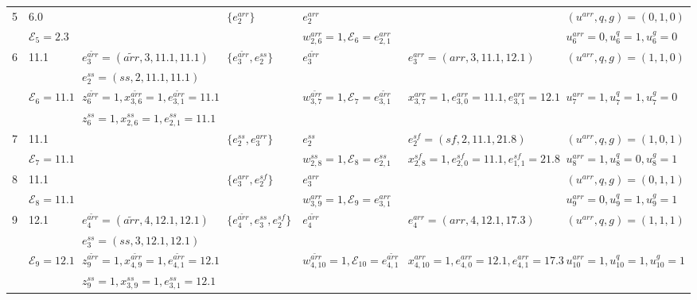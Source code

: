 \documentclass[]{interact}
\theoremstyle{plain}%
\theoremstyle{definition}
\theoremstyle{remark}
\begin{document}
\begin{landscape}
\begin{table}
\begin{tabular}{lllllll}
	     
	     5 & 6.0&&$\{e^{arr}_2\}$&$e^{arr}_{2}$&&$(u^{arr},q,g)=(0,1,0)$\\
	     &$\mathcal{E}_5=2.3$&&&$w^{{arr}}_{2,6}=1,\mathcal{E}_6=e^{{arr}}_{2,1}$&&$u^{arr}_6=0,u^{q}_6=1,u^{g}_6=0$\\\hline
	     
	     
	     6 &11.1 &$e^{\tilde{arr}}_3=({\tilde{arr}},3,11.1,11.1)$&$\{e^{\tilde{arr}}_3,e^{ss}_2\}$ &$e^{\tilde{arr}}_3$ &$e^{{arr}}_3=({{arr}},3,11.1,12.1)$ &$(u^{arr},q,g)=(1,1,0)$\\
	     &&$e^{ss}_2=(ss,2,11.1,11.1)$&&&&\\
	     &$\mathcal{E}_6=11.1$&$z^{\tilde{arr}}_6=1, x^{\tilde{arr}}_{3,6}=1,e^{\tilde{arr}}_{3,1}=11.1$&&$w^{\tilde{arr}}_{3,7}=1,\mathcal{E}_7=e^{\tilde{arr}}_{3,1}$&$x^{{arr}}_{3,7}=1, e^{{arr}}_{3,0}=11.1, e^{{arr}}_{3,1}=12.1$&$u^{arr}_7=1,u^{q}_7=1,u^{g}_7=0$\\
	     &&$z^{ss}_6=1,x^{ss}_{2,6}=1,e^{ss}_{2,1}=11.1$ &&&&\\\hline
	     
	     
	     7 & 11.1& & $\{e^{ss}_2,e^{arr}_3\}$&$e^{ss}_2$&$e^{sf}_2=(sf,2,11.1,21.8)$&$(u^{arr},q,g)=(1,0,1)$\\
	     &$\mathcal{E}_7=11.1$&&&$w^{{ss}}_{2,8}=1,\mathcal{E}_8=e^{{ss}}_{2,1}$&$x^{{sf}}_{2,8}=1, e^{{sf}}_{2,0}=11.1, e^{{sf}}_{1,1}=21.8$&$u^{arr}_8=1,u^{q}_8=0,u^{g}_8=1$\\\hline
	     
	     
	     8 & 11.1&&$\{e^{arr}_3,e^{sf}_2\}$&$e^{arr}_{3}$&&$(u^{arr},q,g)=(0,1,1)$\\
	     &$\mathcal{E}_8=11.1$&&&$w^{{arr}}_{3,9}=1,\mathcal{E}_9=e^{{arr}}_{3,1}$&&$u^{arr}_9=0,u^{q}_9=1,u^{g}_9=1$\\\hline
	     
	     
	     9 & 12.1&$e^{\tilde{arr}}_4=({\tilde{arr}},4,12.1,12.1)$&$\{e^{\tilde{arr}}_4,e^{ss}_3,e^{sf}_2\}$&$e^{\tilde{arr}}_{4}$&$e^{{arr}}_4=({{arr}},4,12.1,17.3)$&$(u^{arr},q,g)=(1,1,1)$\\
	     &&$e^{ss}_3=({ss,3,12.1,12.1})$&&&&\\
	     &$\mathcal{E}_9=12.1$& $z^{\tilde{arr}}_9=1, x^{\tilde{arr}}_{4,9}=1,e^{\tilde{arr}}_{4,1}=12.1$ &&$w^{\tilde{arr}}_{4,10}=1,\mathcal{E}_{10}=e^{\tilde{arr}}_{4,1}$&$x^{{arr}}_{4,10}=1, e^{{arr}}_{4,0}=12.1, e^{{arr}}_{4,1}=17.3$&$u^{arr}_{10}=1,u^{q}_{10}=1,u^{g}_{10}=1$\\
	     &&$z^{ss}_9=1, x^{ss}_{3,9}=1,e^{ss}_{3,1}=12.1$&&&&\\
	     \hline
	     	  
	\end{tabular}
\end{table}
\end{landscape}
\end{document}
